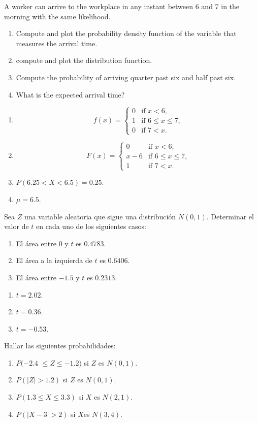 {A worker can arrive to the workplace in any instant between 6 and 7 in the morning with the same likelihood.
\begin{enumerate}
\item Compute and plot the probability density function of the variable that measures the arrival time.
\item compute and plot the distribution function.
\item Compute the probability of arriving quarter past six and half past six.
\item What is the expected arrival time?
\end{enumerate}
}
{
\begin{enumerate}
\item \[
f(x)=
\begin{cases}
0 & \mbox{if $x<6$,}\\
1 & \mbox{if $6\leq x\leq 7$,}\\
0 & \mbox{if $7<x$.}
\end{cases}
\]
\item \[
F(x)=
\begin{cases}
0 & \mbox{if $x<6$,}\\
x-6 & \mbox{if $6\leq x\leq 7$,}\\
1 & \mbox{if $7<x$.}
\end{cases}
\]
\item $P(6.25<X<6.5)=0.25$.
\item $\mu=6.5$.
\end{enumerate}
}
{}


{Sea $Z$ una variable aleatoria que sigue una distribución $N(0,1)$.
Determinar el valor de $t$ en cada uno de los siguientes casos:
\begin{enumerate}
\item El área entre $0$ y $t$ es $0.4783$.
\item El área a la izquierda de $t$ es $0.6406$.
\item El área entre $-1.5$ y $t$ es $0.2313$.
\end{enumerate}
}
{
\begin{enumerate}
\item $t=2.02$.
\item $t=0.36$.
\item $t=-0.53$.
\end{enumerate}
}
{}


{Hallar las siguientes probabilidades:

\begin{enumerate}
\item  $P(-2.4$ $\leq Z\leq -1.2)$ si $Z$ es $N(0,1)$.
\item  $P(\left| Z\right| >1.2)$ si $Z$ es $N(0,1)$.
\item  $P(1.3\leq X\leq 3.3)$ si $X$ es $N(2,1)$.
\item  $P(\left| X-3\right| >2)$ si $X$es $N(3,4)$.
\end{enumerate}
}
{}
{}



